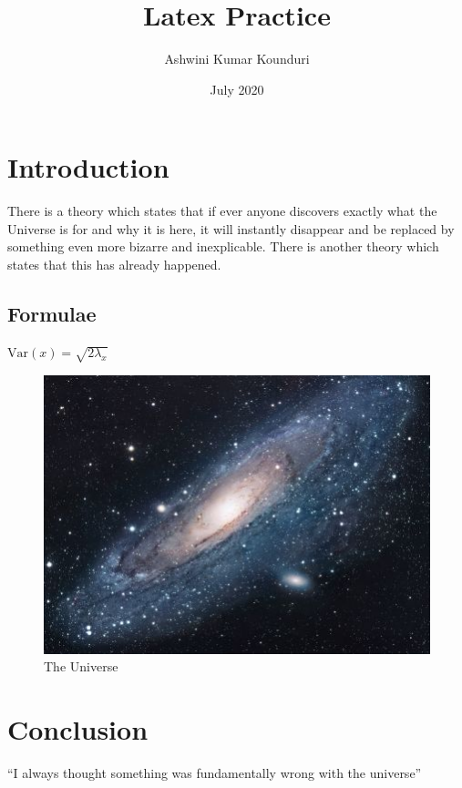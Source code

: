 \documentclass{article}
\title{Latex Practice}
\author{Ashwini Kumar Kounduri}
\date{July 2020}
\begin{document}
    \maketitle


    \section{Introduction}\label{sec:introduction}
    There is a theory which states that if ever anyone discovers exactly what the Universe is for and why it is here, it will instantly disappear and be replaced by something even more bizarre and inexplicable.
    There is another theory which states that this has already happened.

    \subsection{Formulae}\label{subsec:formulae}
    \(\text{Var}(x) = \sqrt{2 \lambda_{x}}\)

    \begin{figure}[h!]
        \centering
        \includegraphics[scale=1.7]{universe}
        \caption{The Universe}
        \label{fig:universe}
    \end{figure}


    \section{Conclusion}\label{sec:conclusion}
    ``I always thought something was fundamentally wrong with the universe'' \citep{adams1995hitchhiker}

    
    
\end{document}
